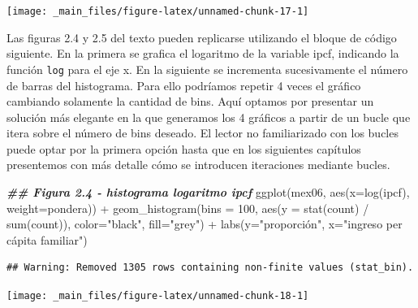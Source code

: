 \documentclass[
]{book}
\newenvironment{Shaded}{\begin{snugshade}}{\end{snugshade}}
\newcommand{\AttributeTok}[1]{\textcolor[rgb]{0.77,0.63,0.00}{#1}}
\newcommand{\DecValTok}[1]{\textcolor[rgb]{0.00,0.00,0.81}{#1}}
\newcommand{\DocumentationTok}[1]{\textcolor[rgb]{0.56,0.35,0.01}{\textbf{\textit{#1}}}}
\newcommand{\FunctionTok}[1]{\textcolor[rgb]{0.00,0.00,0.00}{#1}}
\newcommand{\NormalTok}[1]{#1}
\newcommand{\SpecialCharTok}[1]{\textcolor[rgb]{0.00,0.00,0.00}{#1}}
\newcommand{\StringTok}[1]{\textcolor[rgb]{0.31,0.60,0.02}{#1}}
\begin{document}
\texttt{[image: \_main\_files/figure-latex/unnamed-chunk-17-1]}

Las figuras 2.4 y 2.5 del texto pueden replicarse utilizando el bloque de código siguiente. En la primera se grafica el logaritmo de la variable ipcf, indicando la función \texttt{log} para el eje x. En la siguiente se incrementa sucesivamente el número de barras del histograma. Para ello podríamos repetir 4 veces el gráfico cambiando solamente la cantidad de bins. Aquí optamos por presentar un solución más elegante en la que generamos los 4 gráficos a partir de un bucle que itera sobre el número de bins deseado. El lector no familiarizado con los bucles puede optar por la primera opción hasta que en los siguientes capítulos presentemos con más detalle cómo se introducen iteraciones mediante bucles.

\begin{Shaded}
\begin{Highlighting}[]
\DocumentationTok{\#\# Figura 2.4 {-} histograma logaritmo ipcf}
\FunctionTok{ggplot}\NormalTok{(mex06, }
       \FunctionTok{aes}\NormalTok{(}\AttributeTok{x=}\FunctionTok{log}\NormalTok{(ipcf), }\AttributeTok{weight=}\NormalTok{pondera)) }\SpecialCharTok{+} 
  \FunctionTok{geom\_histogram}\NormalTok{(}\AttributeTok{bins =} \DecValTok{100}\NormalTok{, }\FunctionTok{aes}\NormalTok{(}\AttributeTok{y =} \FunctionTok{stat}\NormalTok{(count) }\SpecialCharTok{/} \FunctionTok{sum}\NormalTok{(count)),}
                 \AttributeTok{color=}\StringTok{"black"}\NormalTok{, }\AttributeTok{fill=}\StringTok{"grey"}\NormalTok{) }\SpecialCharTok{+}
  \FunctionTok{labs}\NormalTok{(}\AttributeTok{y=}\StringTok{"proporción"}\NormalTok{, }\AttributeTok{x=}\StringTok{"ingreso per cápita familiar"}\NormalTok{)}
\end{Highlighting}
\end{Shaded}

\begin{verbatim}
## Warning: Removed 1305 rows containing non-finite values (stat_bin).
\end{verbatim}

\texttt{[image: \_main\_files/figure-latex/unnamed-chunk-18-1]}
\end{document}
